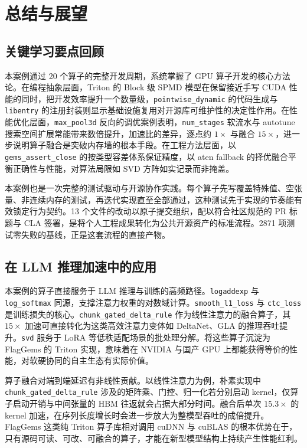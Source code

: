 \clearpage  %

\section{总结与展望}

\subsection{关键学习要点回顾}
本案例通过 20 个算子的完整开发周期，系统掌握了 GPU 算子开发的核心方法论。在编程抽象层面，Triton 的 Block 级 SPMD 模型在保留接近手写 CUDA 性能的同时，把开发效率提升一个数量级，\texttt{pointwise\_dynamic} 的代码生成与 \texttt{libentry} 的注册封装则显示基础设施复用对开源库可维护性的决定性作用。在性能优化层面，\texttt{max\_pool3d} 反向的调优案例表明，\texttt{num\_stages} 软流水与 autotune 搜索空间扩展常能带来数倍提升，加速比的差异，逐点约 $1\times$ 与融合 $15\times$，进一步说明算子融合是突破内存墙的根本手段。在工程方法层面，以 \texttt{gems\_assert\_close} 的按类型容差体系保证精度，以 aten fallback 的择优融合平衡正确性与性能，对算法局限如 SVD 方阵如实记录而非掩盖。

本案例也是一次完整的测试驱动与开源协作实践。每个算子先写覆盖特殊值、空张量、非连续内存的测试，再迭代实现直至全部通过，这种测试先于实现的节奏能有效锁定行为契约。13 个文件的改动以原子提交组织，配以符合社区规范的 PR 标题与 CLA 签署，是将个人工程成果转化为公共开源资产的标准流程。2871 项测试零失败的基线，正是这套流程的直接产物。

\subsection{在 LLM 推理加速中的应用}
本案例的算子直接服务于 LLM 推理与训练的高频路径。\texttt{logaddexp} 与 \texttt{log\_softmax} 同源，支撑注意力权重的对数域计算。\texttt{smooth\_l1\_loss} 与 \texttt{ctc\_loss} 是训练损失的核心。\texttt{chunk\_gated\_delta\_rule} 作为线性注意力的融合算子，其 $15\times$ 加速可直接转化为这类高效注意力变体如 DeltaNet、GLA 的推理吞吐提升。\texttt{svd} 服务于 LoRA 等低秩适配场景的批处理分解。将这些算子沉淀为 FlagGems 的 Triton 实现，意味着在 NVIDIA 与国产 GPU 上都能获得等价的性能，对软硬协同的自主生态有实际价值。

算子融合对端到端延迟有非线性贡献。以线性注意力为例，朴素实现中 \texttt{chunk\_gated\_delta\_rule} 涉及的矩阵乘、门控、归一化若分别启动 kernel，仅算子启动开销与中间张量的 HBM 往返就会占据大部分时间。融合后单次 $15.3\times$ 的 kernel 加速，在序列长度增长时会进一步放大为整模型吞吐的成倍提升。FlagGems 这类纯 Triton 算子库相对调用 cuDNN 与 cuBLAS 的根本优势在于，只有源码可读、可改、可融合的算子，才能在新型模型结构上持续产生性能红利。

